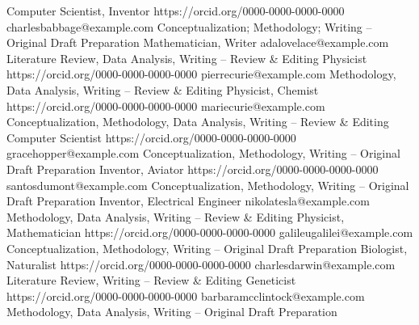 {Computer Scientist, Inventor}
{https://orcid.org/0000-0000-0000-0000}
{charlesbabbage@example.com}
{Conceptualization; Methodology; Writing – Original Draft Preparation}
% 
{Mathematician, Writer}
{} 
{adalovelace@example.com}
{Literature Review, Data Analysis, Writing – Review \& Editing}
% 
{Physicist}
{https://orcid.org/0000-0000-0000-0000}
{pierrecurie@example.com}
{Methodology, Data Analysis, Writing – Review \& Editing}
% 
{Physicist, Chemist}
{https://orcid.org/0000-0000-0000-0000}
{mariecurie@example.com}
{Conceptualization, Methodology, Data Analysis, Writing – Review \& Editing}
% 
{Computer Scientist}
{https://orcid.org/0000-0000-0000-0000}
{gracehopper@example.com}
{Conceptualization, Methodology, Writing – Original Draft Preparation}
% 
{Inventor, Aviator}
{https://orcid.org/0000-0000-0000-0000}
{santosdumont@example.com}
{Conceptualization, Methodology, Writing – Original Draft Preparation}
%
{Inventor, Electrical Engineer}
{} 
{nikolatesla@example.com}
{Methodology, Data Analysis, Writing – Review \& Editing}
%
{Physicist, Mathematician}
{https://orcid.org/0000-0000-0000-0000}
{galileugalilei@example.com}
{Conceptualization, Methodology, Writing – Original Draft Preparation}
%
{Biologist, Naturalist}
{https://orcid.org/0000-0000-0000-0000}
{charlesdarwin@example.com}
{Literature Review, Writing – Review \& Editing}
%
{Geneticist}
{https://orcid.org/0000-0000-0000-0000}
{barbaramcclintock@example.com}
{Methodology, Data Analysis, Writing – Original Draft Preparation}
